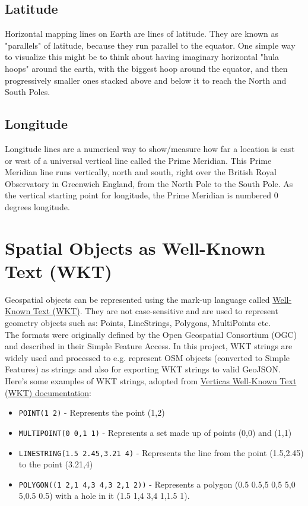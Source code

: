 \subsection{Latitude}
Horizontal mapping lines on Earth are lines of latitude.
They are known as "parallels" of latitude, because they run parallel to the equator.
One simple way to visualize this might be to think about having imaginary horizontal "hula hoops" around the earth,
with the biggest hoop around the equator, and then progressively smaller ones stacked above and
below it to reach the North and South Poles.~\cite{JourneyNorthLatitudeLongitude}
\subsection{Longitude}
Longitude lines are a numerical way to show/measure how far a location is east or west of a universal vertical line called the
Prime Meridian.
This Prime Meridian line runs vertically, north and south, right over the British Royal Observatory in
Greenwich England, from the North Pole to the South Pole.
As the vertical starting point for longitude, the Prime Meridian is numbered 0 degrees longitude.~\cite{JourneyNorthLatitudeLongitude}
\pagebreak
\section{Spatial Objects as Well-Known Text (WKT)}
Geospatial objects can be represented using the mark-up language called \href{https://www.ogc.org/standards/wkt-crs}{Well-Known Text (WKT)}.
They are not case-sensitive and are used to represent geometry objects such as: Points, LineStrings, Polygons, MultiPoints etc.\\
\newline
The formats were originally defined by the Open Geospatial Consortium (OGC) and described in their Simple Feature Access.
In this project, WKT strings are widely used and processed to e.g. represent OSM objects (converted to Simple Features) as strings and also for exporting
WKT strings to valid GeoJSON.~\cite{OGCWKT}\\
\newline
Here's some examples of WKT strings, adopted from \href{https://www.vertica.com/docs/9.3.x/HTML/Content/Authoring/AnalyzingData/Geospatial/Spatial_Definitions/WellknownTextWKT.htm}{Vertica\textquotesingle s Well-Known Text (WKT) documentation}:~\cite{VerticaWKT}
\begin{itemize}
    \item \texttt{POINT(1 2)} - Represents the point (1,2)
    \item \texttt{MULTIPOINT(0 0,1 1)} - Represents a set made up of points (0,0) and (1,1)
    \item \texttt{LINESTRING(1.5 2.45,3.21 4)} - Represents the line from the point (1.5,2.45) to the point (3.21,4)
    \item \texttt{POLYGON((1 2,1 4,3 4,3 2,1 2))} - Represents a polygon (0.5 0.5,5 0,5 5,0 5,0.5 0.5) with a hole in it (1.5 1,4 3,4 1,1.5 1).
\end{itemize}
\pagebreak
